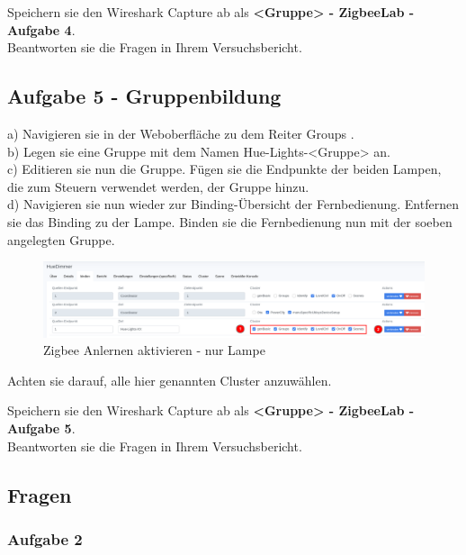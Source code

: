 \begin{Hinweis}
    Speichern sie den Wireshark Capture ab als \textbf{\grqq <Gruppe> - ZigbeeLab - Aufgabe 4\grqq{}}. \\
    Beantworten sie die Fragen in Ihrem Versuchsbericht.
\end{Hinweis}



\subsection{Aufgabe 5 - Gruppenbildung}

a) Navigieren sie in der Weboberfläche zu dem Reiter \grqq Groups \grqq{}. \\
b) Legen sie eine Gruppe mit dem Namen \grqq Hue-Lights-<Gruppe> \grqq{} an.\\
c) Editieren sie nun die Gruppe. Fügen sie die Endpunkte der beiden Lampen, die zum Steuern verwendet werden, der Gruppe hinzu. \\
d) Navigieren sie nun wieder zur Binding-Übersicht der Fernbedienung. Entfernen sie das Binding zu der Lampe. Binden sie die Fernbedienung nun mit der soeben
angelegten Gruppe.

\begin{figure}[H]
    \centering
    \includegraphics[width=1\textwidth]{media/Z2M-Group-Binding.png}
    \caption{Zigbee Anlernen aktivieren - nur Lampe}
\end{figure}

Achten sie darauf, alle hier genannten Cluster anzuwählen.

\begin{Aufgabe}
    Speichern sie den Wireshark Capture ab als \textbf{\grqq <Gruppe> - ZigbeeLab - Aufgabe 5\grqq{}}. \\
    Beantworten sie die Fragen in Ihrem Versuchsbericht.
\end{Aufgabe}


\subsection{Fragen}
\subsubsection{Aufgabe 2}

